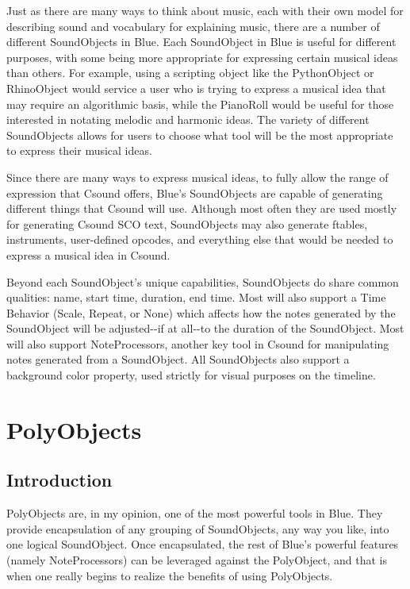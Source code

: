 Just as there are many ways to think about music, each with their own
model for describing sound and vocabulary for explaining music, there
are a number of different SoundObjects in Blue. Each SoundObject in Blue
is useful for different purposes, with some being more appropriate for
expressing certain musical ideas than others. For example, using a
scripting object like the PythonObject or RhinoObject would service a
user who is trying to express a musical idea that may require an
algorithmic basis, while the PianoRoll would be useful for those
interested in notating melodic and harmonic ideas. The variety of
different SoundObjects allows for users to choose what tool will be the
most appropriate to express their musical ideas.

Since there are many ways to express musical ideas, to fully allow the
range of expression that Csound offers, Blue's SoundObjects are capable
of generating different things that Csound will use. Although most often
they are used mostly for generating Csound SCO text, SoundObjects may
also generate ftables, instruments, user-defined opcodes, and everything
else that would be needed to express a musical idea in Csound.

Beyond each SoundObject's unique capabilities, SoundObjects do share
common qualities: name, start time, duration, end time. Most will also
support a Time Behavior (Scale, Repeat, or None) which affects how the
notes generated by the SoundObject will be adjusted-\/-if at all-\/-to
the duration of the SoundObject. Most will also support NoteProcessors,
another key tool in Csound for manipulating notes generated from a
SoundObject. All SoundObjects also support a background color property,
used strictly for visual purposes on the timeline.

\section{PolyObjects}\label{conceptsPolyObjects}

\subsection{Introduction}

PolyObjects are, in my opinion, one of the most powerful tools in Blue.
They provide encapsulation of any grouping of SoundObjects, any way you
like, into one logical SoundObject. Once encapsulated, the rest of
Blue's powerful features (namely NoteProcessors) can be leveraged
against the PolyObject, and that is when one really begins to realize
the benefits of using PolyObjects.

